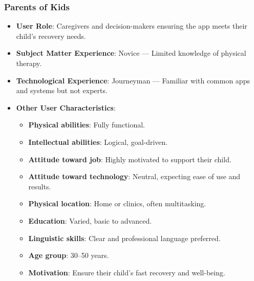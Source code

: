     \subsubsection{Parents of Kids}
        \begin{itemize}
            \item \textbf{User Role}: Caregivers and decision-makers ensuring the app meets their child’s recovery needs.
            \item \textbf{Subject Matter Experience}: Novice --- Limited knowledge of physical therapy.
            \item \textbf{Technological Experience}: Journeyman --- Familiar with common apps and systems but not experts.
            \item \textbf{Other User Characteristics}:
            \begin{itemize}
                \item \textbf{Physical abilities}: Fully functional.
                \item \textbf{Intellectual abilities}: Logical, goal-driven.
                \item \textbf{Attitude toward job}: Highly motivated to support their child.
                \item \textbf{Attitude toward technology}: Neutral, expecting ease of use and results.
                \item \textbf{Physical location}: Home or clinics, often multitasking.
                \item \textbf{Education}: Varied, basic to advanced.
                \item \textbf{Linguistic skills}: Clear and professional language preferred.
                \item \textbf{Age group}: 30--50 years.
                \item \textbf{Motivation}: Ensure their child’s fast recovery and well-being.
            \end{itemize}
        \end{itemize}

